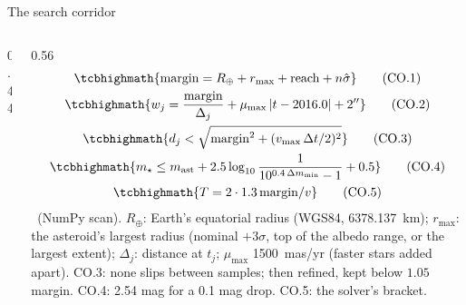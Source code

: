 \begin{frame}{The search corridor}
  \begin{columns}[c]
    \begin{column}{0.44\textwidth}
      \centering
      \corridorfigure
    \end{column}
    \begin{column}{0.56\textwidth}
      \footnotesize\tightdisplays
      \setlength{\jot}{1pt}
      \vspace*{-1ex}
      \begin{gather*}
        \tcbhighmath{\mathrm{margin} = R_\oplus + r_{\max} + \mathrm{reach} + n\hat\sigma} \tag{CO.1}\\
        \tcbhighmath{w_j = \frac{\mathrm{margin}}{\Delta_j} + \mu_{\max}\,|t - 2016.0| + 2''} \tag{CO.2}\\
        \tcbhighmath{d_j < \sqrt{\mathrm{margin}^2 + (v_{\max}\,\Delta t/2)^2}} \tag{CO.3}\\
        \tcbhighmath{m_\star \le m_{\mathrm{ast}} + 2.5\log_{10}\frac{1}{10^{0.4\,\Delta m_{\min}} - 1} + 0.5} \tag{CO.4}\\
        \tcbhighmath{T = 2 \cdot 1.3\, \mathrm{margin}/v} \tag{CO.5}
      \end{gather*}
      \vspace*{-1ex}
      {\scriptsize \OWN\ (NumPy scan). $R_\oplus$: Earth's equatorial radius (WGS84, \SI{6378.137}{km}); $r_{\max}$: the asteroid's
      largest radius (nominal $+3\sigma$, top of the albedo range, or the largest extent);
      $\Delta_j$: distance at $t_j$; $\mu_{\max}$ \SI{1500}{mas/yr} (faster stars added apart).
      CO.3: none slips between samples; then refined, kept below $1.05\,$margin.
      CO.4: 2.54 mag for a 0.1 mag drop. CO.5: the solver's bracket.}
    \end{column}
  \end{columns}
\end{frame}
\fi

